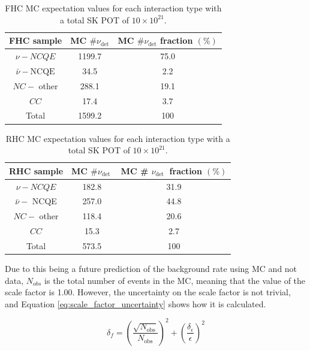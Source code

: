 \begin{table}
    \centering
    \begin{tabular}{||ccc||}
        \hline FHC sample & MC $\# \nu_{\mathrm{det}}$ & MC $\# \nu_{\mathrm{det}}$ fraction $(\%)$ \\
        \hline$\nu-N C Q E$ & 1199.7 & 75.0 \\
        $\bar{\nu}-\mathrm{NCQE}$ & 34.5 & 2.2 \\
        $N C-$ other & 288.1 & 19.1 \\
        $C C$ & 17.4 & 3.7 \\
        \hline Total & 1599.2 & 100 \\
        \hline
        \end{tabular}        
    \caption{FHC MC expectation values for each interaction type with a total SK POT of $10 \times 10^{21}$.}
    \label{table:nu_FHC_mc}
\end{table}


\begin{table}
    \centering
    \begin{tabular}{||ccc||}
        \hline RHC sample & MC $\# \nu_{\text {det }}$ & MC \# $\nu_{\text {det }}$ fraction $(\%)$ \\
        \hline$\nu-N C Q E$ & 182.8 & 31.9 \\
        $\bar{\nu}-$ NCQE & 257.0 & 44.8 \\
        $N C-$ other & 118.4 & 20.6 \\
        $C C$ & 15.3 & 2.7 \\
        \hline Total & 573.5 & 100 \\
        \hline
    \end{tabular}
    \caption{RHC MC expectation values for each interaction type with a total SK POT of $10 \times 10^{21}$.}
    \label{table:nu_RHC_mc}
\end{table}

Due to this being a future prediction of the background rate using MC and not data, $N_{obs}$ is the total number of events in the MC, meaning that the value of the scale factor is 1.00. However, the uncertainty on the scale factor is not trivial, and Equation \ref{eq:scale_factor_uncertainty} shows how it is calculated.

\begin{equation}
    \delta_{f} = \left({\frac{\sqrt{N_{\text{obs}}}}{N_{\text{obs}}}}\right)^{2} + \left({\frac{\delta_{\epsilon}}{\epsilon}}\right)^{2}
\label{eq:scale_factor_uncertainty}
\end{equation}

